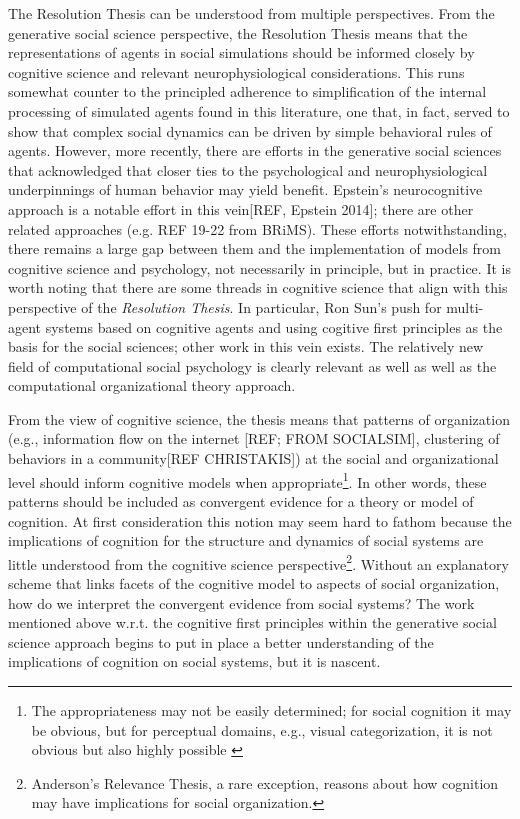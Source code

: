 \documentclass{article}
\begin{document}
The Resolution Thesis can be understood from multiple perspectives.  From the generative social science perspective, the Resolution Thesis means that the representations of agents in social simulations should be informed closely by cognitive science and relevant neurophysiological considerations.  This runs somewhat counter to the principled adherence to simplification of the internal processing of simulated agents found in this literature, one that, in fact, served to show that complex social dynamics can be driven by simple behavioral rules of agents.  However, more recently, there are efforts in the generative social sciences that acknowledged that closer ties to the psychological and neurophysiological underpinnings of human behavior may yield benefit.  Epstein's neurocognitive approach is a notable effort in this vein[REF, Epstein 2014]; there are other related approaches (e.g. REF 19-22 from BRiMS).  These efforts notwithstanding, there remains a large gap between them and the implementation of models from cognitive science and psychology, not necessarily in principle, but in practice. It is worth noting that there are some threads in cognitive science that align with this perspective of the \textit{Resolution Thesis}.  In particular, Ron Sun's push for multi-agent systems based on cognitive agents and using cogitive first principles as the basis for the social sciences\cite{sun2006}; other work in this vein exists\cite{Bhattacharyya2010}.  The relatively new field of computational social psychology is clearly relevant as well \cite{vallacher2017} as well as the computational organizational theory approach\cite{prietula1998}.


From the view of cognitive science, the thesis means that patterns of organization (e.g., information flow on the internet [REF; FROM SOCIALSIM], clustering of behaviors in a community[REF CHRISTAKIS]) at the social and organizational level should inform cognitive models when appropriate\footnote{The appropriateness may not be easily determined; for social cognition it may be obvious, but for perceptual domains, e.g., visual categorization, it is not obvious but also highly possible \cite{Culture&Categorization}}.  In other words, these patterns should be included as convergent evidence for a theory or model of cognition.  At first consideration this notion may seem hard to fathom because the implications of cognition for the structure and dynamics of social systems are little understood from the cognitive science perspective\footnote{Anderson's Relevance Thesis, a rare exception, reasons about how cognition may have implications for social organization.}.  Without an explanatory scheme that links facets of the cognitive model to aspects of social organization, how do we interpret the convergent evidence from social systems?  The work mentioned above w.r.t. the cognitive first principles within the generative social science approach \cite{sun2006,prietula1998,vallacher2017,Bhattacharyya2010} begins to put in  place a better understanding of the implications of cognition on social systems, but it is nascent.  
\end{document}
